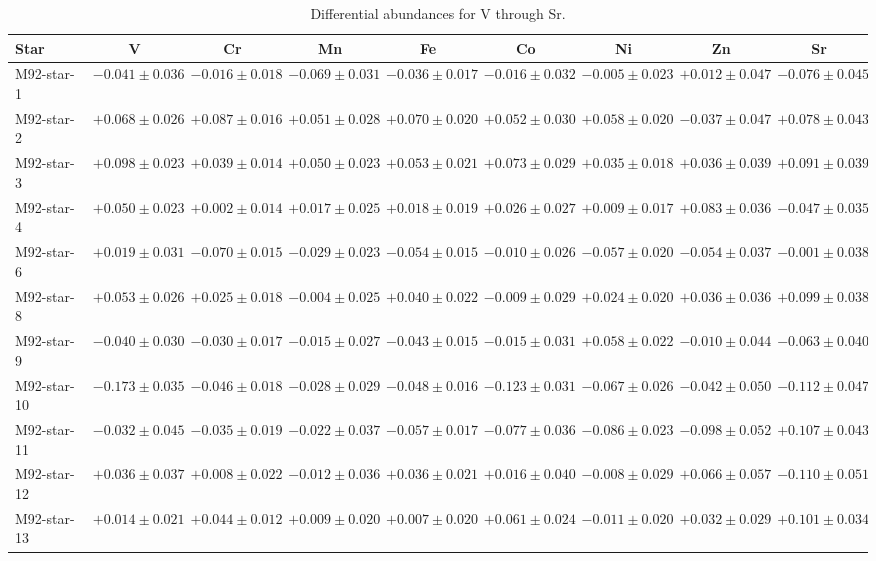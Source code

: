 \begin{table}
\caption{Differential abundances for V through Sr.}\label{tab:abund2}
\begin{tabular*}{\textheight}{@{\extracolsep\fill}l c c c c c c c c@{}}
\toprule
Star & V & Cr & Mn & Fe & Co & Ni & Zn & Sr \\ \midrule
M92-star-1 & $-0.041 \pm 0.036$ & $-0.016 \pm 0.018$ & $-0.069 \pm 0.031$ & $-0.036 \pm 0.017$ & $-0.016 \pm 0.032$ & $-0.005 \pm 0.023$ & $+0.012 \pm 0.047$ & $-0.076 \pm 0.045$ \\ 
M92-star-2 & $+0.068 \pm 0.026$ & $+0.087 \pm 0.016$ & $+0.051 \pm 0.028$ & $+0.070 \pm 0.020$ & $+0.052 \pm 0.030$ & $+0.058 \pm 0.020$ & $-0.037 \pm 0.047$ & $+0.078 \pm 0.043$ \\ 
M92-star-3 & $+0.098 \pm 0.023$ & $+0.039 \pm 0.014$ & $+0.050 \pm 0.023$ & $+0.053 \pm 0.021$ & $+0.073 \pm 0.029$ & $+0.035 \pm 0.018$ & $+0.036 \pm 0.039$ & $+0.091 \pm 0.039$ \\ 
M92-star-4 & $+0.050 \pm 0.023$ & $+0.002 \pm 0.014$ & $+0.017 \pm 0.025$ & $+0.018 \pm 0.019$ & $+0.026 \pm 0.027$ & $+0.009 \pm 0.017$ & $+0.083 \pm 0.036$ & $-0.047 \pm 0.035$ \\ 
M92-star-6 & $+0.019 \pm 0.031$ & $-0.070 \pm 0.015$ & $-0.029 \pm 0.023$ & $-0.054 \pm 0.015$ & $-0.010 \pm 0.026$ & $-0.057 \pm 0.020$ & $-0.054 \pm 0.037$ & $-0.001 \pm 0.038$ \\ 
M92-star-8 & $+0.053 \pm 0.026$ & $+0.025 \pm 0.018$ & $-0.004 \pm 0.025$ & $+0.040 \pm 0.022$ & $-0.009 \pm 0.029$ & $+0.024 \pm 0.020$ & $+0.036 \pm 0.036$ & $+0.099 \pm 0.038$ \\ 
M92-star-9 & $-0.040 \pm 0.030$ & $-0.030 \pm 0.017$ & $-0.015 \pm 0.027$ & $-0.043 \pm 0.015$ & $-0.015 \pm 0.031$ & $+0.058 \pm 0.022$ & $-0.010 \pm 0.044$ & $-0.063 \pm 0.040$ \\ 
M92-star-10 & $-0.173 \pm 0.035$ & $-0.046 \pm 0.018$ & $-0.028 \pm 0.029$ & $-0.048 \pm 0.016$ & $-0.123 \pm 0.031$ & $-0.067 \pm 0.026$ & $-0.042 \pm 0.050$ & $-0.112 \pm 0.047$ \\ 
M92-star-11 & $-0.032 \pm 0.045$ & $-0.035 \pm 0.019$ & $-0.022 \pm 0.037$ & $-0.057 \pm 0.017$ & $-0.077 \pm 0.036$ & $-0.086 \pm 0.023$ & $-0.098 \pm 0.052$ & $+0.107 \pm 0.043$ \\ 
M92-star-12 & $+0.036 \pm 0.037$ & $+0.008 \pm 0.022$ & $-0.012 \pm 0.036$ & $+0.036 \pm 0.021$ & $+0.016 \pm 0.040$ & $-0.008 \pm 0.029$ & $+0.066 \pm 0.057$ & $-0.110 \pm 0.051$ \\ 
M92-star-13 & $+0.014 \pm 0.021$ & $+0.044 \pm 0.012$ & $+0.009 \pm 0.020$ & $+0.007 \pm 0.020$ & $+0.061 \pm 0.024$ & $-0.011 \pm 0.020$ & $+0.032 \pm 0.029$ & $+0.101 \pm 0.034$ \\ 

\end{tabular*}
\end{table}
